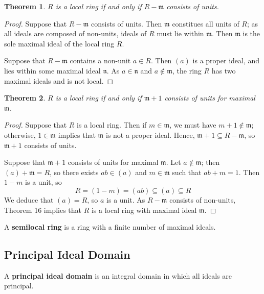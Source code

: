 \documentclass[11pt]{article}
\newtheorem{theorem}{Theorem}
\begin{document}
\begin{adjustwidth}{0.5cm}{}
	\begin{theorem}
		$R$ is a local ring if and only if $R - \mathfrak{m}$ consists of units.
	\end{theorem}
	\begin{proof}
		Suppose that $R - \mathfrak{m}$ consists of units. Then $\mathfrak{m}$ constitues all units of $R$; as all ideals are composed of non-units, ideals of $R$ must lie within $\mathfrak{m}$. Then $\mathfrak{m}$ is the sole maximal ideal of the local ring $R$.

		Suppose that $R - \mathfrak{m}$ contains a non-unit $a \in R$. Then $(a)$ is a proper ideal, and lies within some maximal ideal $\mathfrak{n}$. As $a \in \mathfrak{n}$ and $a \notin \mathfrak{m}$, the ring $R$ has two maximal ideals and is not local.
	\end{proof}
	\begin{theorem}
		$R$ is a local ring if and only if $\mathfrak{m} + 1$ consists of units for maximal $\mathfrak{m}$.
	\end{theorem}
	\begin{proof}
		Suppose that $R$ is a local ring. Then if $m \in \mathfrak{m}$, we must have $m + 1 \notin \mathfrak{m}$; otherwise, $1 \in \mathfrak{m}$ implies that $\mathfrak{m}$ is not a proper ideal. Hence, $\mathfrak{m} + 1 \subseteq R - \mathfrak{m}$, so $\mathfrak{m} + 1$ consists of units.

		Suppose that $\mathfrak{m} + 1$ consists of units for maximal $\mathfrak{m}$. Let $a \notin \mathfrak{m}$; then $(a) + \mathfrak{m} = R$, so there exists $ab \in (a)$ and $m \in \mathfrak{m}$ such that $ab + m = 1$. Then $1 - m$ is a unit, so
		\[
			R = (1 - m) = (ab) \subseteq (a) \subseteq R
		\]
		We deduce that $(a) = R$, so $a$ is a unit. As $R - \mathfrak{m}$ consists of non-units, Theorem 16 implies that $R$ is a local ring with maximal ideal $\mathfrak{m}$.
	\end{proof}
\end{adjustwidth}

A \textbf{semilocal ring} is a ring with a finite number of maximal ideals.


\subsection{Principal Ideal Domain}

A \textbf{principal ideal domain} is an integral domain in which all ideals are principal.
\end{document}
